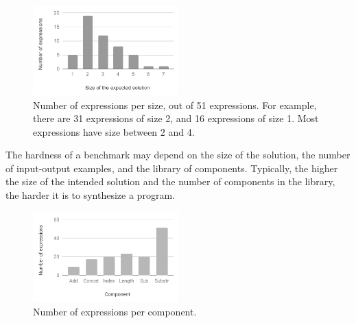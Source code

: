 \begin{figure}
  \centering
  \includegraphics[width=0.5\textwidth]{assets/bar-chart-sizes-51.pdf}

  \caption{Number of expressions per size, out of 51 expressions.
    For example, there are 31 expressions of size 2, and 16 expressions of size
    1.
    Most expressions have size between 2 and 4.}
  \label{fig:bar-chart-sizes-51}
\end{figure}

The hardness of a benchmark may depend on the size of the solution, the number
of input-output examples, and the library of components.
Typically, the higher the size of the intended solution and the number of
components in the library, the harder it is to synthesize a program.

\begin{figure}
  \centering
  \includegraphics[width=0.5\textwidth]{assets/bar-chart-components-freq-51.pdf}
  \caption{Number of expressions per component.}
  \label{fig:bar-chart-components-freq-51}
\end{figure}


